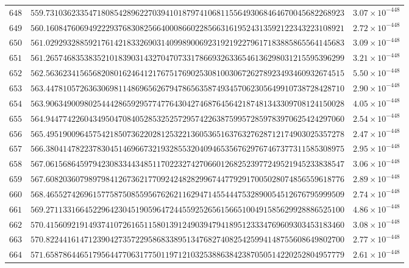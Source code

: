 \documentclass[12pt,reqno]{amsart}
\theoremstyle{remark}
\begin{document}
\begin{longtable}{clc}
$648$ & $559.7310362335471808542896227039410187974106811556493068464670045682268923$ & $3.07\times 10^{-448}$ \\
$649$ & $560.1608476069492229376830825664000866022856631619524313592122343223108921$ & $2.72\times 10^{-448}$ \\
$650$ & $561.0292932885921761421833269031409989006923192192279617183885865564145683$ & $3.09\times 10^{-448}$ \\
$651$ & $561.2657468353835210183903143270470733178669326336546136298031215595396299$ & $3.21\times 10^{-448}$ \\
$652$ & $562.5636234156568208016246412176751769025308100306726278923493460932674515$ & $5.50\times 10^{-448}$ \\
$653$ & $563.4478105726363069811486965626794786563587493457062305649910738728428710$ & $2.90\times 10^{-448}$ \\
$654$ & $563.9063490098025444286592957747764304274687645642187481343309708124150028$ & $4.05\times 10^{-448}$ \\
$655$ & $564.9447742260434950470840528532525729574226387599572859783970625424297060$ & $2.54\times 10^{-448}$ \\
$656$ & $565.4951900964575421850736220281253221360536516376327628712174903025357278$ & $2.47\times 10^{-448}$ \\
$657$ & $566.3804147822378304514696673219328553204094653567629767467377311585308975$ & $2.95\times 10^{-448}$ \\
$658$ & $567.0615686459794230833443485117022327427066012682523977249521945233838547$ & $3.06\times 10^{-448}$ \\
$659$ & $567.6082036079897984126736217709242482829967447792917005028074856559618776$ & $2.89\times 10^{-448}$ \\
$660$ & $568.4655274269615775875085595676262116294714554447532890054512676795999509$ & $2.74\times 10^{-448}$ \\
$661$ & $569.2711331664522964230451905964724455925265615665100491585629928886525100$ & $4.86\times 10^{-448}$ \\
$662$ & $570.4156092191493741072616511580139124903947941895123334769609303453183460$ & $3.08\times 10^{-448}$ \\
$663$ & $570.8224416147123904273572295868338951347682740825425994148755608649802700$ & $2.77\times 10^{-448}$ \\
$664$ & $571.6587864465179564477063177501197121032538863842387050514220252804957779$ & $2.61\times 10^{-448}$ \\

\end{longtable}
\end{document}

